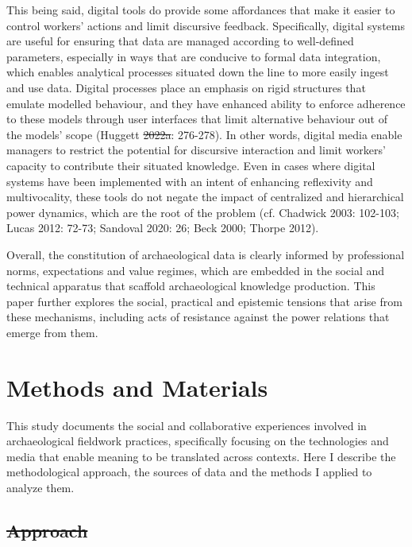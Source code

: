 \documentclass[
]{article}
\makeatletter
\providecommand{\DIFadd}[1]{{\protect\color{blue}\uwave{#1}}} %
\providecommand{\DIFdel}[1]{{\protect\color{red}\sout{#1}}} %
\providecommand{\DIFaddbegin}{} %
\providecommand{\DIFaddend}{} %
\providecommand{\DIFdelbegin}{} %
\providecommand{\DIFdelend}{} %
\newcommand{\DIFscaledelfig}{0.5}
\newlength{\DIFdelgraphicswidth} %
\newlength{\DIFdelgraphicsheight} %
\newcommand{\DIFaddincludegraphics}[2][]{{\color{blue}\fbox{\DIFOincludegraphics[#1]{#2}}}} %
\newcommand{\DIFdelincludegraphics}[2][]{%
\sbox{\DIFdelgraphicsbox}{\DIFOincludegraphics[#1]{#2}}%
\settoboxwidth{\DIFdelgraphicswidth}{\DIFdelgraphicsbox} %
\settoboxtotalheight{\DIFdelgraphicsheight}{\DIFdelgraphicsbox} %
\scalebox{\DIFscaledelfig}{%
\parbox[b]{\DIFdelgraphicswidth}{\usebox{\DIFdelgraphicsbox}\\[-\baselineskip] \rule{\DIFdelgraphicswidth}{0em}}\llap{\resizebox{\DIFdelgraphicswidth}{\DIFdelgraphicsheight}{%
\setlength{\unitlength}{\DIFdelgraphicswidth}%
\begin{picture}(1,1)%
\thicklines\linethickness{2pt} %
{\color[rgb]{1,0,0}\put(0,0){\framebox(1,1){}}}%
{\color[rgb]{1,0,0}\put(0,0){\line( 1,1){1}}}%
{\color[rgb]{1,0,0}\put(0,1){\line(1,-1){1}}}%
\end{picture}%
}\hspace*{3pt}}} %
} %
\DeclareRobustCommand{\DIFaddbegin}{\DIFOaddbegin \let\includegraphics\DIFaddincludegraphics} %
\DeclareRobustCommand{\DIFaddend}{\DIFOaddend \let\includegraphics\DIFOincludegraphics} %
\DeclareRobustCommand{\DIFdelbegin}{\DIFOdelbegin \let\includegraphics\DIFdelincludegraphics} %
\DeclareRobustCommand{\DIFdelend}{\DIFOaddend \let\includegraphics\DIFOincludegraphics} %
\let\sout@orig\sout %
\renewcommand{\sout}[1]{\ifmmode\text{\sout@orig{\ensuremath{#1}}}\else\sout@orig{#1}\fi} %
\makeatother
\begin{document}
This being said, digital tools do provide some affordances that make it
easier to control workers' actions and limit discursive feedback.
Specifically, digital systems are useful for ensuring that data are
managed according to well-defined parameters, especially in ways that
are conducive to formal data integration, which enables analytical
processes situated down the line to more easily ingest and use data.
Digital processes place an emphasis on rigid structures that emulate
modelled behaviour, and they have enhanced ability to enforce adherence
to these models through user interfaces that limit alternative behaviour
out of the models' scope (Huggett \DIFdelbegin \DIFdel{2022a}\DIFdelend \DIFaddbegin \DIFadd{2022}\DIFaddend : 276-278). In other words,
digital media enable managers to restrict the potential for discursive
interaction and limit workers' capacity to contribute their situated
knowledge. Even in cases where digital systems have been implemented
with an intent of enhancing reflexivity and multivocality, these tools
do not negate the impact of centralized and hierarchical power dynamics,
which are the root of the problem (cf. Chadwick 2003: 102-103; Lucas
2012: 72-73; Sandoval 2020: 26; Beck 2000; Thorpe 2012).

Overall, the constitution of archaeological data is clearly informed by
professional norms, expectations and value regimes, which are embedded
in the social and technical apparatus that scaffold archaeological
knowledge production. This paper further explores the social, practical
and epistemic tensions that arise from these mechanisms, including acts
of resistance against the power relations that emerge from them.

\section{Methods and Materials}\label{methods-and-materials}

This study documents the social and collaborative experiences involved
in archaeological fieldwork practices, specifically focusing on the
technologies and media that enable meaning to be translated across
contexts. Here I describe the methodological approach, the sources of
data and the methods I applied to analyze them.

\DIFdelbegin \subsection{\DIFdel{Approach}}%
\addtocounter{subsection}{-1}%
\end{document}
